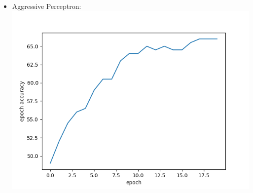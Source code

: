 \begin{enumerate}
\begin{enumerate}
\begin{itemize}
      \item Aggressive Perceptron:\\ \includegraphics{aggressiveMP.png}
    \end{itemize}
  \end{enumerate}
\end{enumerate}

